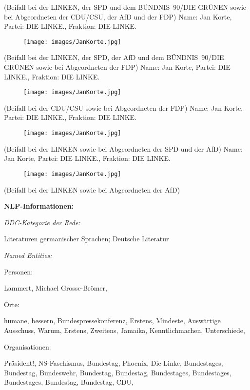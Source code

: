 \documentclass[10pt, a4paper]{report}
\begin{document}
(Beifall bei der LINKEN, der SPD und dem BÜNDNIS 90/DIE GRÜNEN sowie bei Abgeordneten der CDU/CSU, der AfD und der FDP)
Name: Jan Korte, Partei: DIE LINKE., Fraktion: DIE LINKE.

\begin{figure}[!ht]
\texttt{[image: images/JanKorte.jpg]}
\end{figure}


(Beifall bei der LINKEN, der SPD, der AfD und dem BÜNDNIS 90/DIE GRÜNEN sowie bei Abgeordneten der FDP)
Name: Jan Korte, Partei: DIE LINKE., Fraktion: DIE LINKE.

\begin{figure}[!ht]
\texttt{[image: images/JanKorte.jpg]}
\end{figure}


(Beifall bei der CDU/CSU sowie bei Abgeordneten der FDP)
Name: Jan Korte, Partei: DIE LINKE., Fraktion: DIE LINKE.

\begin{figure}[!ht]
\texttt{[image: images/JanKorte.jpg]}
\end{figure}


(Beifall bei der LINKEN sowie bei Abgeordneten der SPD und der AfD)
Name: Jan Korte, Partei: DIE LINKE., Fraktion: DIE LINKE.

\begin{figure}[!ht]
\texttt{[image: images/JanKorte.jpg]}
\end{figure}


(Beifall bei der LINKEN sowie bei Abgeordneten der AfD)


\textbf{NLP-Informationen:}

\textit{DDC-Kategorie der Rede:}

Literaturen germanischer Sprachen; Deutsche Literatur

\textit{Named Entities:}

Personen:

Lammert, Michael Grosse-Brömer, 

Orte:

humane, bessern, Bundespressekonferenz, Erstens, Mindeste, Auswärtige Ausschuss, Warum, Erstens, Zweitens, Jamaika, Kenntlichmachen, Unterschiede, 

Organisationen:

Präsident!, NS-Faschismus, Bundestag, Phoenix, Die Linke, Bundestages, Bundestag, Bundeswehr, Bundestag, Bundestag, Bundestages, Bundestages, Bundestages, Bundestag, Bundestag, CDU, 
\end{document}
